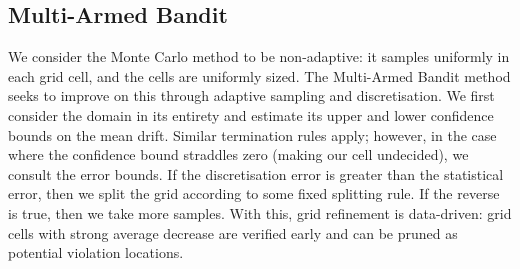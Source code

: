 

\subsection{Multi-Armed Bandit}
\label{sec:mab}

We consider the Monte Carlo method to be non-adaptive: it samples uniformly in each grid cell, and the cells are uniformly sized. The Multi-Armed Bandit method seeks to improve on this through adaptive sampling and discretisation. We first consider the domain in its entirety and estimate its upper and lower confidence bounds on the mean drift. Similar termination rules apply; however, in the case where the confidence bound straddles zero (making our cell undecided), we consult the error bounds. If the discretisation error is greater than the statistical error, then we split the grid according to some fixed splitting rule. If the reverse is true, then we take more samples. With this, grid refinement is data-driven: grid cells with strong average decrease are verified early and can be pruned as potential violation locations.

